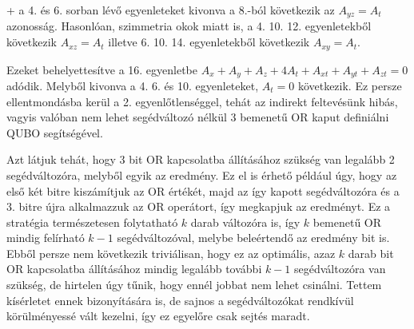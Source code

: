 \begin{theorem}
		\Az+ a 4. és 6. sorban lévő egyenleteket kivonva a 8.-ból következik az $A_{yz}=A_{t}$ azonosság. Hasonlóan, szimmetria okok miatt is, a 4. 10. 12. egyenletekből következik $A_{xz}=A_{t}$ illetve 6. 10. 14. egyenletekből következik $A_{xy}=A_{t}$.
		
		Ezeket behelyettesítve a 16. egyenletbe $A_{x}+A_{y}+A_{z}+4A_{t}+A_{xt}+A_{yt}+A_{zt}=0$ adódik. Melyből kivonva a 4. 6. és 10. egyenleteket, $A_{t}=0$ következik. Ez persze ellentmondásba kerül a 2. egyenlőtlenséggel, tehát az indirekt feltevésünk hibás, vagyis valóban nem lehet segédváltozó nélkül 3 bemenetű OR kaput definiálni QUBO segítségével.	
\end{theorem}

Azt látjuk tehát, hogy 3 bit OR kapcsolatba állításához szükség van legalább 2 segédváltozóra, melyből egyik az eredmény. Ez el is érhető például úgy, hogy az első két bitre kiszámítjuk az OR értékét, majd az így kapott segédváltozóra és a 3. bitre újra alkalmazzuk az OR operátort, így megkapjuk az eredményt. Ez a stratégia természetesen folytatható $k$ darab változóra is, így $k$ bemenetű OR mindig felírható $k-1$ segédváltozóval, melybe beleértendő az eredmény bit is. Ebből persze nem következik triviálisan, hogy ez az optimális, azaz $k$ darab bit OR kapcsolatba állításához mindig legalább további $k-1$ segédváltozóra van szükség, de hirtelen úgy tűnik, hogy ennél jobbat nem lehet csinálni. Tettem kísérletet ennek bizonyítására is, de sajnos a segédváltozókat rendkívül körülményessé vált kezelni, így ez egyelőre csak sejtés maradt.

